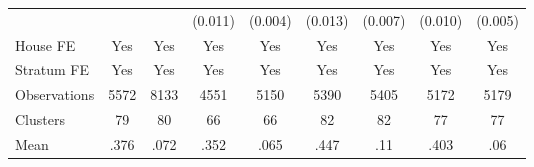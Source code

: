 {\begin{tabular}{l*{8}{c}}
                &                  &                  &  (0.011)         &  (0.004)         &  (0.013)         &  (0.007)         &  (0.010)         &  (0.005)         \\
House FE        &      Yes         &      Yes         &      Yes         &      Yes         &      Yes         &      Yes         &      Yes         &      Yes         \\
Stratum FE      &      Yes         &      Yes         &      Yes         &      Yes         &      Yes         &      Yes         &      Yes         &      Yes         \\
\midrule
Observations    &     5572         &     8133         &     4551         &     5150         &     5390         &     5405         &     5172         &     5179         \\
Clusters        &       79         &       80         &       66         &       66         &       82         &       82         &       77         &       77         \\
Mean            &     .376         &     .072         &     .352         &     .065         &     .447         &      .11         &     .403         &      .06         \\
\bottomrule
\end{tabular}
}

